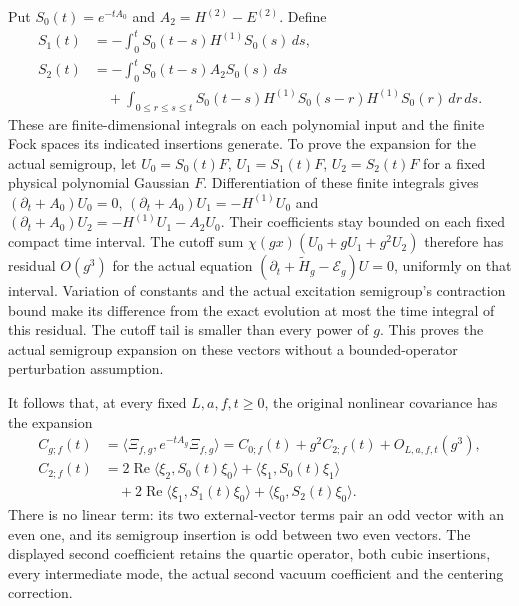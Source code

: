 \documentclass[11pt]{article}
\begin{document}
Put $S_0(t)=e^{-tA_0}$ and $A_2=H^{(2)}-E^{(2)}$. Define
\begin{align}
 S_1(t)&=-\int_0^t S_0(t-s)H^{(1)}S_0(s)\,ds,\nonumber\\
 S_2(t)&=-\int_0^t S_0(t-s)A_2S_0(s)\,ds\nonumber\\
 &\quad+\int_{0\le r\le s\le t}
 S_0(t-s)H^{(1)}S_0(s-r)H^{(1)}S_0(r)\,dr\,ds .
       \label{eq:vertex-semigroup-coefficients}
\end{align}
These are finite-dimensional integrals on each polynomial input and
the finite Fock spaces its indicated insertions generate. To prove
the expansion for the actual semigroup, let $U_0=S_0(t)F$,
$U_1=S_1(t)F$, $U_2=S_2(t)F$ for a fixed physical polynomial
Gaussian $F$. Differentiation of these finite integrals gives
$(\partial_t+A_0)U_0=0$,
$(\partial_t+A_0)U_1=-H^{(1)}U_0$ and
$(\partial_t+A_0)U_2=-H^{(1)}U_1-A_2U_0$.
Their coefficients stay bounded on each fixed compact time interval.
The cutoff sum $\chi(gx)(U_0+gU_1+g^2U_2)$ therefore has residual
$O(g^3)$ for the actual equation
$(\partial_t+\widetilde H_g-\mathcal E_g)U=0$, uniformly on
that interval. Variation of constants and the actual excitation
semigroup's contraction bound make its difference from the exact
evolution at most the time integral of this residual. The cutoff
tail is smaller than every power of $g$. This proves the actual
semigroup expansion on these vectors without a bounded-operator
perturbation assumption.

It follows that, at every fixed $L,a,f,t\ge0$, the original nonlinear
covariance has the expansion
\begin{align}
 C_{g;f}(t)&=\langle\Xi_{f,g},e^{-tA_g}\Xi_{f,g}\rangle
       =C_{0;f}(t)+g^2 C_{2;f}(t)+O_{L,a,f,t}(g^3),
       \label{eq:vertex-C2}\\
 C_{2;f}(t)&=2\operatorname{Re}\langle\xi_2,S_0(t)\xi_0\rangle
       +\langle\xi_1,S_0(t)\xi_1\rangle\nonumber\\
 &\quad+2\operatorname{Re}\langle\xi_1,S_1(t)\xi_0\rangle
       +\langle\xi_0,S_2(t)\xi_0\rangle .\nonumber
\end{align}
There is no linear term: its two external-vector terms pair an odd
vector with an even one, and its semigroup insertion is odd between
two even vectors. The displayed second coefficient retains the
quartic operator, both cubic insertions, every intermediate mode,
the actual second vacuum coefficient and the centering correction.
\end{document}
